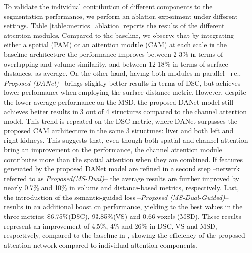 \documentclass[journal]{IEEEtran}
\begin{document}
\begin{comment}
\midrule
\end{tabular}
\caption{Ablation study on different proposed attention modules on the Chaos dataset (multi-organ segmentation on MRI task). The values show the average result of the experiments averaged over the 3 folds. Best results are represented in red bold, while blue is used to highlight the second best performance.}
\label{table:metrics_ablation}
\end{table*}
\end{comment}




To validate the individual contribution of different components to the segmentation performance, we perform an ablation experiment under different settings. Table \ref{table:metrics_ablation} reports the results of the different attention modules. Compared to the baseline, we observe that by integrating either a spatial (PAM) or an attention module (CAM) at each scale in the baseline architecture the performance improves between 2-3\% in terms of overlapping and volume similarity, and between 12-18\% in terms of surface distances, as average. On the other hand, having both modules in parallel --i.e., \textit{Proposed (DANet)}-- brings slightly better results in terms of DSC, but achieves lower performance when employing the surface distance metric. However, despite the lower average performance on the MSD, the proposed DANet model still achieves better results in 3 out of 4 structures compared to the channel attention model. This trend is repeated on the DSC metric, where DANet surpasses the proposed CAM architecture in the same 3 structures: liver and both left and right kidneys. This suggests that, even though both spatial and channel attention bring an improvement on the performance, the channel attention module contributes more than the spatial attention when they are combined. If features generated by the proposed DANet model are refined in a second step --network referred to as \textit{Proposed(MS-Dual)}-- the average results are further improved by nearly 0.7\% and 10\% in volume and distance-based metrics, respectively. Last, the introduction of the semantic-guided loss --\textit{Proposed (MS-Dual-Guided)}-- results in an additional boost on performance, yielding to the best values in the three metrics: 86.75\%(DSC), 93.85\%(VS) and 0.66 voxels (MSD). These results represent an improvement of 4.5\%, 4\% and 26\% in DSC, VS and MSD, respectively, compared to the baseline in \cite{wang18d}, showing the efficiency of the proposed attention network compared to individual attention components.
\end{document}
